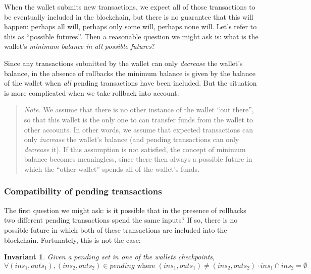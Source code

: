 \documentclass{article}
\newtheorem{invariant}{Invariant}
\begin{document}
When the wallet submits new transactions, we expect all of those transactions
to be eventually included in the blockchain, but there is no guarantee that this
will happen: perhaps all will, perhaps only some will, perhaps none will. Let's
refer to this as ``possible futures''. Then a reasonable question we might ask
is: what is the wallet's \emph{minimum balance in all possible futures}?

Since any transactions submitted by the wallet can only \emph{decrease} the
wallet's balance, in the absence of rollbacks the minimum balance is given
by the balance of the wallet when \emph{all} pending transactions have been
included. But the situation is more complicated when we take rollback into
account.

\begin{quote}
\emph{Note.} We assume that there is no other instance of the wallet
``out there'', so that this wallet is the only one to can transfer funds
from the wallet to other accounts. In other words, we assume that expected
transactions can only \emph{increase} the wallet's balance (and pending
transactions can only \emph{decrease} it). If this assumption is not satisfied,
the concept of minimum balance becomes meaningless, since there then always
a possible future in which the ``other wallet'' spends all of the wallet's
funds.
\end{quote}

\subsubsection{Compatibility of pending transactions}

The first question we might ask: is it possible that in the presence of
rollbacks two different pending transactions spend the same inputs? If so, there
is no possible future in which both of these transactions are included into the
blockchain. Fortunately, this is not the case:

\begin{invariant}
Given a $\mathit{pending}$ set in one of the wallets checkpoints,
\begin{equation*}
\forall (\mathit{ins}_1, \mathit{outs}_1), (\mathit{ins}_2, \mathit{outs}_2) \in \mathit{pending} \text{ where } (\mathit{ins}_1, \mathit{outs}_1) \ne (\mathit{ins}_2, \mathit{outs}_2) \cdot
\mathit{ins}_1 \cap \mathit{ins}_2 = \emptyset
\end{equation*}
\end{invariant}
\end{document}
